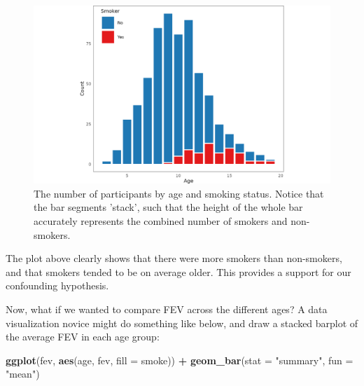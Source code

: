 \documentclass[
]{book}
\newenvironment{Shaded}{\begin{snugshade}}{\end{snugshade}}
\newcommand{\AttributeTok}[1]{\textcolor[rgb]{0.13,0.29,0.53}{#1}}
\newcommand{\FunctionTok}[1]{\textcolor[rgb]{0.13,0.29,0.53}{\textbf{#1}}}
\newcommand{\NormalTok}[1]{#1}
\newcommand{\SpecialCharTok}[1]{\textcolor[rgb]{0.81,0.36,0.00}{\textbf{#1}}}
\newcommand{\StringTok}[1]{\textcolor[rgb]{0.31,0.60,0.02}{#1}}
\theoremstyle{definition}
\theoremstyle{definition}
\theoremstyle{definition}
\theoremstyle{definition}
\theoremstyle{remark}
\begin{document}
\begin{figure}

{\centering \includegraphics[width=1\linewidth,height=1\textheight]{./figures/grammar-barplot-counts} 

}

\caption{The number of participants by age and smoking status. Notice that the bar segments 'stack', such that the height of the whole bar accurately represents the combined number of smokers and non-smokers.}\label{fig:grammar-barplot-counts}
\end{figure}

The plot above clearly shows that there were more smokers than non-smokers, and that smokers tended to be on average older. This provides a support for our confounding hypothesis.

Now, what if we wanted to compare FEV across the different ages? A data visualization novice might do something like below, and draw a stacked barplot of the average FEV in each age group:

\begin{Shaded}
\begin{Highlighting}[]
\FunctionTok{ggplot}\NormalTok{(fev, }\FunctionTok{aes}\NormalTok{(age, fev, }\AttributeTok{fill =}\NormalTok{ smoke)) }\SpecialCharTok{+}
  \FunctionTok{geom\_bar}\NormalTok{(}\AttributeTok{stat =} \StringTok{"summary"}\NormalTok{, }\AttributeTok{fun =} \StringTok{"mean"}\NormalTok{)}
\end{Highlighting}
\end{Shaded}
\end{document}
